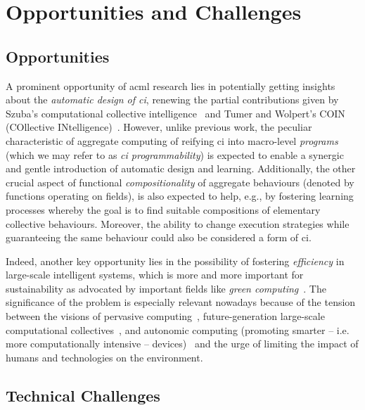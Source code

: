 \section{Opportunities and Challenges}


\subsection*{Opportunities}

A prominent opportunity of \ac{acml} research lies 
 in potentially getting insights 
 about the \emph{automatic design 
 of \acf{ci}},
 renewing the partial contributions
 given by Szuba's computational collective intelligence~\cite{DBLP:journals/fgcs/Szuba01}
 and Tumer and Wolpert's COIN (COllective INtelligence)~\cite{DBLP:journals/jair/WolpertT02}.
%
However, unlike previous work, 
 the peculiar characteristic of aggregate computing 
 of reifying \ac{ci} into macro-level \emph{programs}
 (which we may refer to as \emph{\ac{ci} programmability})
 is expected to enable a synergic and gentle introduction of automatic design and learning.
%
Additionally, the other crucial aspect of
 functional \emph{compositionality} of aggregate behaviours (denoted by functions operating on fields),
 is also expected to help, e.g.,
 by fostering learning processes
 whereby the goal is to find suitable
 compositions of elementary collective behaviours.
%
Moreover, the ability to change execution strategies while guaranteeing the same behaviour could also be considered a form of \ac{ci}.

Indeed, another key opportunity 
 lies in the possibility of fostering \emph{efficiency}
 in large-scale intelligent systems,
 which is more and more important
 for sustainability
 as advocated by important fields
 like \emph{green computing}~\cite{DBLP:journals/iet-net/SarkarM16}.
%
The significance of the problem 
 is especially relevant nowadays because
 of the tension between
 the visions of pervasive computing~\cite{DBLP:journals/computer/SahaM03}, future-generation large-scale computational collectives~\cite{DBLP:journals/eaai/CasadeiVAPD21}, and autonomic computing (promoting smarter -- i.e. more computationally intensive -- devices)~\cite{DBLP:journals/computer/KephartC03}
 and the urge of limiting the impact
 of humans and technologies on the environment.
%
\subsection*{Technical Challenges}

